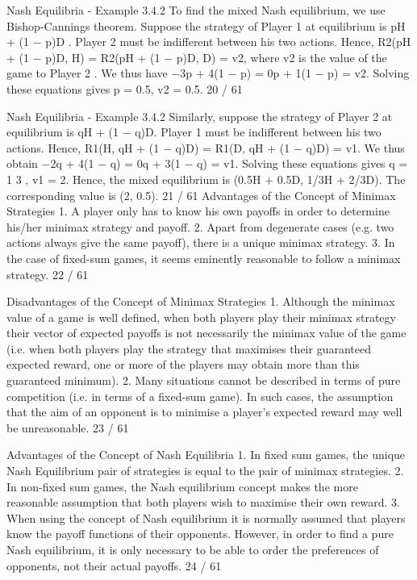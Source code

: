 Nash Equilibria - Example 3.4.2
To find the mixed Nash equilibrium, we use Bishop-Cannings
theorem. Suppose the strategy of Player 1 at equilibrium is
pH + (1 − p)D . Player 2 must be indifferent between his two
actions. Hence,
R2(pH + (1 − p)D, H) = R2(pH + (1 − p)D, D) = v2,
where v2 is the value of the game to Player 2 .
We thus have −3p + 4(1 − p) = 0p + 1(1 − p) = v2. Solving these
equations gives p = 0.5, v2 = 0.5.
20 / 61

Nash Equilibria - Example 3.4.2
Similarly, suppose the strategy of Player 2 at equilibrium is
qH + (1 − q)D. Player 1 must be indifferent between his two
actions. Hence,
R1(H, qH + (1 − q)D) = R1(D, qH + (1 − q)D) = v1.
We thus obtain −2q + 4(1 − q) = 0q + 3(1 − q) = v1. Solving
these equations gives q =
1
3
, v1 = 2.
Hence, the mixed equilibrium is (0.5H + 0.5D, 1/3H + 2/3D). The
corresponding value is (2, 0.5).
21 / 61
Advantages of the Concept of Minimax Strategies
1. A player only has to know his own payoffs in order to
determine his/her minimax strategy and payoff.
2. Apart from degenerate cases (e.g. two actions always
give the same payoff), there is a unique minimax
strategy.
3. In the case of fixed-sum games, it seems eminently
reasonable to follow a minimax strategy.
22 / 61

Disadvantages of the Concept of Minimax Strategies
1. Although the minimax value of a game is well
defined, when both players play their minimax
strategy their vector of expected payoffs is not
necessarily the minimax value of the game (i.e. when
both players play the strategy that maximises their
guaranteed expected reward, one or more of the
players may obtain more than this guaranteed
minimum).
2. Many situations cannot be described in terms of pure
competition (i.e. in terms of a fixed-sum game). In
such cases, the assumption that the aim of an
opponent is to minimise a player’s expected reward
may well be unreasonable.
23 / 61

Advantages of the Concept of Nash Equilibria
1. In fixed sum games, the unique Nash Equilibrium pair
of strategies is equal to the pair of minimax
strategies.
2. In non-fixed sum games, the Nash equilibrium
concept makes the more reasonable assumption that
both players wish to maximise their own reward.
3. When using the concept of Nash equilibrium it is
normally assumed that players know the payoff
functions of their opponents. However, in order to
find a pure Nash equilibrium, it is only necessary to
be able to order the preferences of opponents, not
their actual payoffs.
24 / 61


